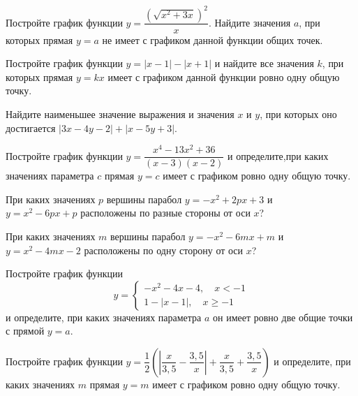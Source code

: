 \begin{homework}[number=3]
	\begin{listofex}
		\item Постройте график функции \( y=\dfrac{(\sqrt{x^2+3x})^2}{x} \).  Найдите значения \( a \), при которых прямая \( y=a \) не имеет с графиком данной функции общих точек.
		\item Постройте график функции \( y=|x-1|-|x+1| \) и найдите все значения \( k \), при которых прямая \( y=kx \) имеет с графиком данной функции ровно одну общую точку.
		\item Найдите наименьшее значение выражения и значения \( x \) и \( y \), при которых оно достигается \( |3x-4y-2|+|x-5y+3| \).
	\end{listofex}
\end{homework}

\begin{class}[number=7]
	\begin{listofex}
		\item Постройте график функции \(y=\dfrac{ x^4-13x^2+36 }{ (x-3)(x-2) }\) и определите,при каких значениях параметра \(c\) прямая \(y=c\) имеет с графиком ровно одну общую точку.
		\item При каких значениях \(p\) вершины парабол \(y=-x^2+2px+3\) и \\ \(y=x^2-6px+p\) расположены по разные стороны от оси \(x\)?
		\item При каких значениях \(m\) вершины парабол \(y=-x^2-6mx+m\) и \\ \(y=x^2-4mx-2\) расположены по одну сторону от оси \(x\)?
		\item Постройте график функции \[ y= \begin{cases} -x^2-4x-4, \quad x<-1 \\ 1-|x-1|, \quad x\ge-1 \end{cases} \] и определите, при каких значениях параметра \(a\) он имеет ровно две общие точки с прямой \(y=a\).
		\item Постройте график функции \( y=\dfrac{ 1 }{ 2 }\left( \left| \dfrac{ x }{ 3,5 }-\dfrac{ 3,5 }{ x } \right| +\dfrac{ x }{ 3,5 } + \dfrac{ 3,5 }{ x } \right) \) и определите, при каких значениях \(m\) прямая \(y=m\) имеет с графиком ровно одну общую точку.
	\end{listofex}
\end{class}

